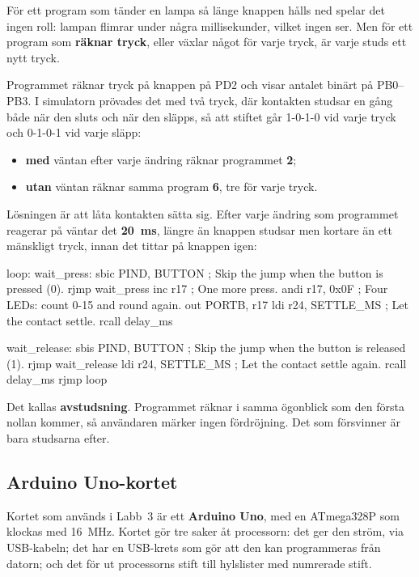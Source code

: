 
För ett program som tänder en lampa så länge knappen hålls ned spelar det ingen roll: lampan
flimrar under några millisekunder, vilket ingen ser. Men för ett program som \textbf{räknar tryck},
eller växlar något för varje tryck, är varje studs ett nytt tryck.

Programmet  räknar tryck på knappen på PD2 och visar antalet binärt på
PB0--PB3. I simulatorn prövades det med två tryck, där kontakten studsar en gång både när den sluts
och när den släpps, så att stiftet går 1-0-1-0 vid varje tryck och 0-1-0-1 vid varje släpp:
\begin{itemize}
  \item \textbf{med} väntan efter varje ändring räknar programmet \textbf{2};
  \item \textbf{utan} väntan räknar samma program \textbf{6}, tre för varje tryck.
\end{itemize}

Lösningen är att låta kontakten sätta sig. Efter varje ändring som programmet reagerar på väntar
det \textbf{20~ms}, längre än knappen studsar men kortare än ett mänskligt tryck, innan det tittar
på knappen igen:

\begin{asmcode}
loop:
wait_press:
    sbic PIND, BUTTON               ; Skip the jump when the button is pressed (0).
    rjmp wait_press
    inc r17                         ; One more press.
    andi r17, 0x0F                  ; Four LEDs: count 0-15 and round again.
    out PORTB, r17
    ldi r24, SETTLE_MS              ; Let the contact settle.
    rcall delay_ms

wait_release:
    sbis PIND, BUTTON               ; Skip the jump when the button is released (1).
    rjmp wait_release
    ldi r24, SETTLE_MS              ; Let the contact settle again.
    rcall delay_ms
    rjmp loop
\end{asmcode}

\noindent Det kallas \textbf{avstudsning}. Programmet räknar i samma ögonblick som den första nollan
kommer, så användaren märker ingen fördröjning. Det som försvinner är bara studsarna efter.

\subsection{Arduino Uno-kortet}
\label{c11:a5}
Kortet som används i Labb~3 är ett \textbf{Arduino Uno}, med en ATmega328P som klockas med
16~MHz. Kortet gör tre saker åt processorn: det ger den ström, via USB-kabeln; det har en USB-krets
som gör att den kan programmeras från datorn; och det för ut processorns stift till hylslister med
numrerade stift.

